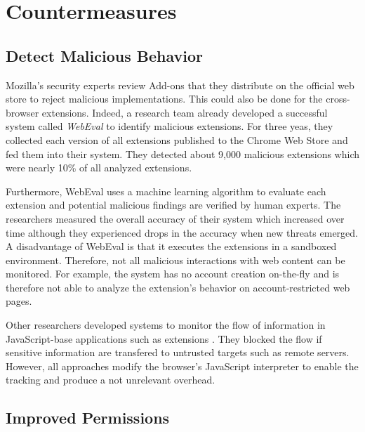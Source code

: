 
\chapter{Countermeasures}
\label{chp:countermeasures}


\section{Detect Malicious Behavior}
\label{sec:detectMaliciousBehavior}
	 
	Mozilla's security experts review Add-ons that they distribute on the official web store to reject malicious implementations. This could also be done for the cross-browser extensions. Indeed, a research team already developed a successful system called \textit{WebEval} to identify malicious extensions. For three yeas, they collected each version of all extensions published to the Chrome Web Store and fed them into their system. They detected about 9,000 malicious extensions which were nearly 10\% of all analyzed extensions.
	
	Furthermore, WebEval uses a machine learning algorithm to evaluate each extension and potential malicious findings are verified by human experts. The researchers measured the overall accuracy of their system which increased over time although they experienced drops in the accuracy when new threats emerged. \\
	A disadvantage of WebEval is that it executes the extensions in a sandboxed environment. Therefore, not all malicious interactions with web content can be monitored. For example, the system has no account creation on-the-fly and is therefore not able to analyze the extension's behavior on account-restricted web pages.
	
	Other researchers developed systems to monitor the flow of information in JavaScript-base applications such as extensions \cite{Dhawan:2009:AIF:1723192.1723250, Hallaraker:2005:DMJ:1078029.1078861, cs2015sentinel,ndss2007xss}. They blocked the flow if sensitive information are transfered to untrusted targets such as remote servers. However, all approaches modify the browser's JavaScript interpreter to enable the tracking and produce a not unrelevant overhead.

\section{Improved Permissions}
\label{sec:improvedPermissions}

